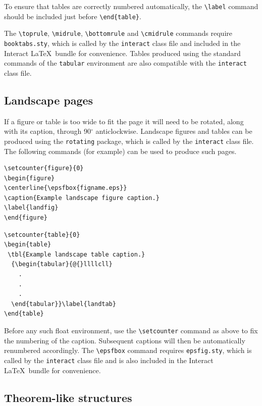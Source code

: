 \documentclass[]{interact}
\theoremstyle{plain}%
\theoremstyle{definition}
\theoremstyle{remark}
\begin{document}
To ensure that tables are correctly numbered automatically, the \verb"\label" command should be included just before \verb"\end{table}".

The \verb"\toprule", \verb"\midrule", \verb"\bottomrule" and \verb"\cmidrule" commands require \verb"booktabs.sty", which is called by the \texttt{interact} class file and included in the \textsf{Interact} \LaTeX\ bundle for convenience. Tables produced using the standard commands of the \texttt{tabular} environment are also compatible with the \texttt{interact} class file.


\subsection{Landscape pages}

If a figure or table is too wide to fit the page it will need to be rotated, along with its caption, through 90$^{\circ}$ anticlockwise. Landscape figures and tables can be produced using the \verb"rotating" package, which is called by the \texttt{interact} class file. The following commands (for example) can be used to produce such pages.
\begin{verbatim}
\setcounter{figure}{0}
\begin{figure}
\centerline{\epsfbox{figname.eps}}
\caption{Example landscape figure caption.}
\label{landfig}
\end{figure}
\end{verbatim}
\begin{verbatim}
\setcounter{table}{0}
\begin{table}
 \tbl{Example landscape table caption.}
  {\begin{tabular}{@{}llllcll}
    .
    .
    .
  \end{tabular}}\label{landtab}
\end{table}
\end{verbatim}
Before any such float environment, use the \verb"\setcounter" command as above to fix the numbering of the caption. Subsequent captions will then be automatically renumbered accordingly.
The \verb"\epsfbox" command requires \verb"epsfig.sty", which is called by the \texttt{interact} class file and is also included in the \textsf{Interact} \LaTeX\ bundle for convenience.


\subsection{Theorem-like structures}
\end{document}
